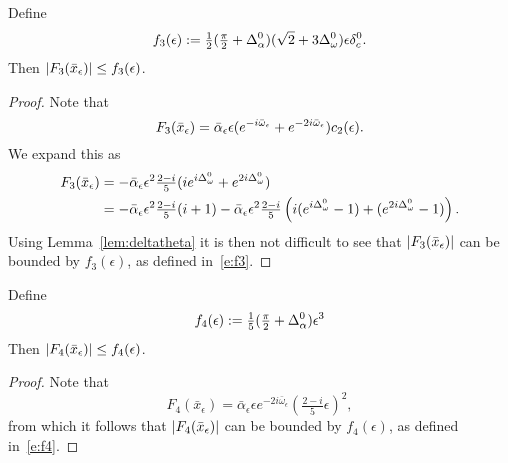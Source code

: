 \begin{proposition}
		\label{prop:YfBound3}
	Define 
		\begin{equation}\label{e:f3} 
		f_3(\epsilon):= \tfrac{1}{2}(\tfrac{\pi}{2} + \Delta_\alpha^0 )  ( \sqrt{2} + 3 \Delta_\omega^0 )
			 \epsilon \delta_c^0   .
		\end{equation} 
	Then $| F_3(\bar{x}_\epsilon) | \leq  f_3(\epsilon)$. 
\end{proposition}
%
\begin{proof}
Note that 
\[
F_3( \bar{x}_\epsilon) = \bar{\alpha}_\epsilon \epsilon ( e^{- i \bar{\omega}_\epsilon} + e^{-2 i \bar{\omega}_\epsilon}) c_2( \epsilon)  . \\
\]
We expand this as
\begin{alignat*}{1}
F_3( \bar{x}_\epsilon) &= -\bar{\alpha}_\epsilon \epsilon^2 \tfrac{2-i}{5} ( i e^{ i \Delta_\omega^0 } + e^{2 i \Delta_\omega^0 }) \\
&= -\bar{\alpha}_\epsilon \epsilon^2 \tfrac{2-i}{5} ( i+1) -\bar{\alpha}_\epsilon \epsilon^2 \tfrac{2-i}{5} \left( i ( e^{ i \Delta_\omega^0 }-1) +( e^{2 i \Delta_\omega^0 } -1)\right)  .
\end{alignat*}
Using Lemma~\ref{lem:deltatheta} it is then not difficult to see that $|F_3(\bar{x}_\epsilon)|$ can be bounded by $f_3(\epsilon)$, as defined in~\eqref{e:f3}.
\end{proof}



\begin{proposition}
		\label{prop:YfBound4}
Define
\begin{equation}\label{e:f4}
	f_4(\epsilon) := \tfrac{1}{5} (\pp+\da^0) \epsilon^3   %
\end{equation}
	Then $| F_4(\bar{x}_\epsilon) | \leq  f_4(\epsilon)$. 
\end{proposition}
%
\begin{proof}
Note that 
\[
F_4( \bar{x}_\epsilon ) =  \bar{\alpha}_\epsilon \epsilon  e^{-2 i \bar{\omega}_\epsilon} \left(\tfrac{2-i}{5}\epsilon \right)^2 ,
\]
from which it follows that $|F_4(\bar{x}_\epsilon)|$ can be bounded by $f_4(\epsilon)$, as defined in~\eqref{e:f4}.
\end{proof}



